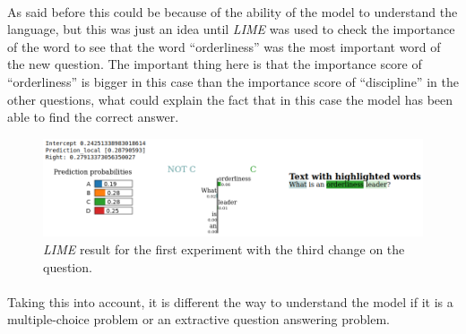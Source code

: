 \paragraph{}
As said before this could be because of the ability of the model to understand the language, but this was just an idea until \emph{LIME} was used to check the importance of the word to see that the word ``orderliness'' was the most important word of the new question. The important thing here is that the importance score of ``orderliness'' is bigger in this case than the importance score of ``discipline'' in the other questions, what could explain the fact that in this case the model has been able to find the correct answer.
\begin{figure}[!h]
	\centering
	\includegraphics[scale=0.35]{images/lime-ex1-example1-modC-real}
	\caption{\emph{LIME} result for the first experiment with the third change on the question.}
	\label{fig:lime-result-q-1d}
\end{figure}

\paragraph{}
 Taking this into account, it is different the way to understand the model if it is a multiple-choice problem or an extractive question answering problem.

